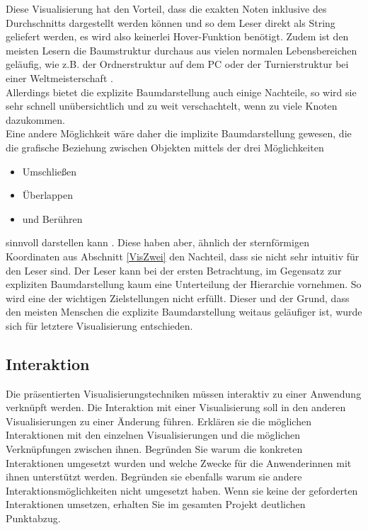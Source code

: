 \documentclass[usegeometry=true]{scrartcl}
\begin{document}
Diese Visualisierung hat den Vorteil, dass die exakten Noten inklusive des Durchschnitts dargestellt werden können und so dem Leser direkt als String geliefert werden, es wird also keinerlei Hover-Funktion benötigt. Zudem ist den meisten Lesern die Baumstruktur durchaus aus vielen normalen Lebensbereichen geläufig, wie z.B. der Ordnerstruktur auf dem PC oder der Turnierstruktur bei einer Weltmeisterschaft \cite{Hinneburg2022}.\\
Allerdings bietet die explizite Baumdarstellung auch einige Nachteile, so wird sie sehr schnell unübersichtlich und zu weit verschachtelt, wenn zu viele Knoten dazukommen.\\
Eine andere Möglichkeit wäre daher die implizite Baumdarstellung gewesen, die die grafische Beziehung zwischen Objekten mittels der drei Möglichkeiten

\begin{itemize}
\item Umschließen
\item Überlappen
\item und Berühren
\end{itemize}

\noindent sinnvoll darstellen kann \cite{Hinneburg2022}. Diese haben aber, ähnlich der sternförmigen Koordinaten aus Abschnitt \ref{VisZwei} den Nachteil, dass sie nicht sehr intuitiv für den Leser sind. Der Leser kann bei der ersten Betrachtung, im Gegensatz zur expliziten Baumdarstellung kaum eine Unterteilung der Hierarchie vornehmen. So wird eine der wichtigen Zielstellungen nicht erfüllt. Dieser und der Grund, dass den meisten Menschen die explizite Baumdarstellung weitaus geläufiger ist, wurde sich für letztere Visualisierung entschieden. 






\subsection{Interaktion}
\label{Interaktion}
Die präsentierten Visualisierungstechniken müssen interaktiv zu einer Anwendung verknüpft werden.
Die Interaktion mit einer Visualisierung soll in den anderen Visualisierungen zu einer Änderung führen. 
Erklären sie die möglichen Interaktionen mit den einzelnen Visualisierungen und die möglichen Verknüpfungen zwischen ihnen. Begründen Sie warum die konkreten Interaktionen umgesetzt wurden und welche Zwecke für die Anwenderinnen mit ihnen unterstützt werden. Begründen sie ebenfalls warum sie andere Interaktionsmöglichkeiten nicht umgesetzt haben. Wenn sie keine der geforderten Interaktionen umsetzen, erhalten Sie im gesamten Projekt deutlichen Punktabzug. 
\end{document}
